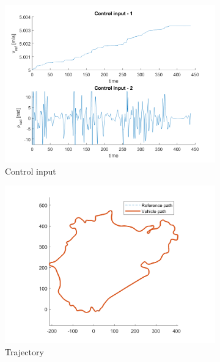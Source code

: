 \begin{figure}[H]
    \centering
     \begin{subfigure}[b]{0.47\textwidth}
         \centering
         \includegraphics[width=\textwidth]{Latex report/image/ex2/input.png}
         \caption{Control input}
         \label{fig:input}
     \end{subfigure}
     \begin{subfigure}[b]{0.45\textwidth}
         \centering
         \includegraphics[width=\textwidth]{Latex report/image/ex2/trajectory.png}
         \caption{Trajectory}
         \label{fig:traj}
     \end{subfigure}
     \begin{subfigure}[b]{0.8\textwidth}

\end{subfigure}
\end{figure}
